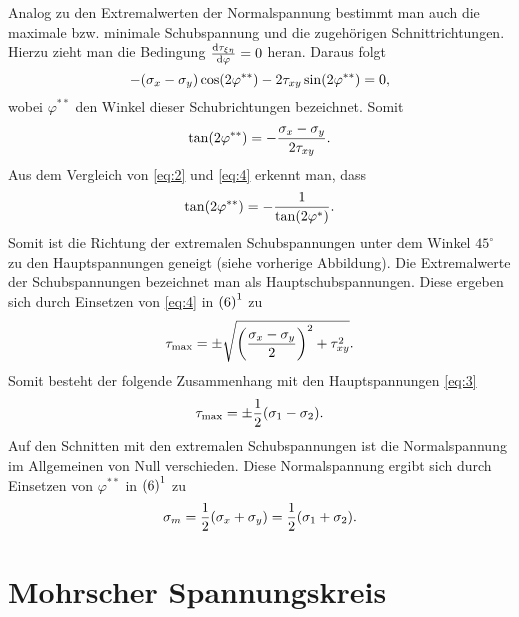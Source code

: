 \documentclass{lecture}
\begin{document}
    Analog zu den Extremalwerten der Normalspannung bestimmt man auch die maximale bzw. minimale Schubspannung und die zugehörigen Schnittrichtungen.
    Hierzu zieht man die Bedingung \(\frac{\d\tau_{\xi\eta}}{\d\varphi} = 0\) heran.
    Daraus folgt
    \[
        -\parentheses*{\sigma_x - \sigma_y}\cos\parentheses*{2\varphi^{**}} - 2\tau_{xy}\sin\parentheses*{2\varphi^{**}} = 0,
    \]
    wobei \(\varphi^{**}\) den Winkel dieser Schubrichtungen bezeichnet.
    Somit
    \begin{equation}\label{eq:4}
        \tan\parentheses*{2\varphi^{**}} = -\frac{\sigma_x - \sigma_y}{2\tau_{xy}}.
    \end{equation}
    Aus dem Vergleich von \eqref{eq:2} und \eqref{eq:4} erkennt man, dass
    \[
        \tan\parentheses*{2\varphi^{**}} = -\frac{1}{\tan\parentheses*{2\varphi^*}}.
    \]
    Somit ist die Richtung der extremalen Schubspannungen unter dem Winkel \(45^\circ\) zu den Hauptspannungen geneigt (siehe vorherige Abbildung).
    Die Extremalwerte der Schubspannungen bezeichnet man als Hauptschubspannungen.
    Diese ergeben sich durch Einsetzen von \eqref{eq:4} in \(\textup{(6)}^1\) zu
    \[
        \tau_{\text{max}} = \pm\sqrt{\parentheses*{\frac{\sigma_x - \sigma_y}{2}}^2 + \tau_{xy}^2}.
    \]
    Somit besteht der folgende Zusammenhang mit den Hauptspannungen \eqref{eq:3}
    \[
        \tau_{\text{max}} = \pm\frac{1}{2}\parentheses*{\sigma_1 - \sigma_2}.
    \]
    Auf den Schnitten mit den extremalen Schubspannungen ist die Normalspannung im Allgemeinen von Null verschieden.
    Diese Normalspannung ergibt sich durch Einsetzen von \(\varphi^{**}\) in \(\textup{(6)}^1\) zu
    \begin{equation}\label{eq:5}
        \sigma_m = \frac{1}{2}\parentheses*{\sigma_x + \sigma_y} = \frac{1}{2}\parentheses*{\sigma_1 + \sigma_2}.
    \end{equation}


    \section*{Mohrscher Spannungskreis}
\end{document}

